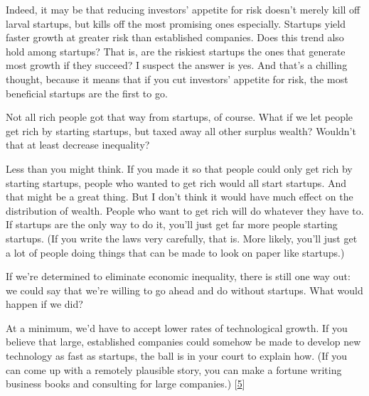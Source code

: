 Indeed, it may be that reducing investors'
                  appetite for risk doesn't merely kill off larval startups, but
                  kills off the most promising ones especially. Startups yield
                  faster growth at greater risk than established companies. Does
                  this trend also hold among startups? That is, are the riskiest
                  startups the ones that generate most growth if they succeed? I
                  suspect the answer is yes. And that's a chilling thought,
                  because it means that if you cut investors' appetite for risk,
                  the most beneficial startups are the first to go.

Not
                  all rich people got that way from startups, of course. What if
                  we let people get rich by starting startups, but taxed away
                  all other surplus wealth? Wouldn't that at least decrease
                  inequality?

Less than you might think. If you made
                  it so that people could only get rich by starting startups,
                  people who wanted to get rich would all start startups. And
                  that might be a great thing. But I don't think it would have
                  much effect on the distribution of wealth. People who want to
                  get rich will do whatever they have to. If startups are the
                  only way to do it, you'll just get far more people starting
                  startups. (If you write the laws very carefully, that is. More
                  likely, you'll just get a lot of people doing things that can
                  be made to look on paper like startups.)

If we're
                  determined to eliminate economic inequality, there is still
                  one way out: we could say that we're willing to go ahead and
                  do without startups. What would happen if we did?

At
                  a minimum, we'd have to accept lower rates of technological
                  growth. If you believe that large, established companies could
                  somehow be made to develop new technology as fast as startups,
                  the ball is in your court to explain how. (If you can come up
                  with a remotely plausible story, you can make a fortune
                  writing business books and consulting for large companies.)
                  [\href{\#f5n}{5}]

